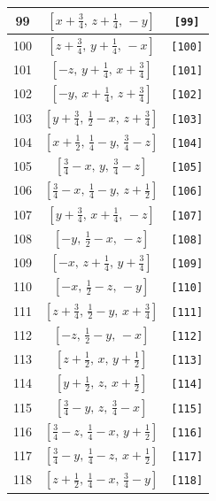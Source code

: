 \documentclass[fleqn,8pt]{jsarticle}
\begin{document}
\begin{longtable}{ccc}
99 & $\left[ x + \frac{3}{4},\, z + \frac{1}{4},\, - y \right]$ & {\tt [99]} \\ \hline
100 & $\left[ z + \frac{3}{4},\, y + \frac{1}{4},\, - x \right]$ & {\tt [100]} \\ \hline
101 & $\left[ - z,\, y + \frac{1}{4},\, x + \frac{3}{4} \right]$ & {\tt [101]} \\ \hline
102 & $\left[ - y,\, x + \frac{1}{4},\, z + \frac{3}{4} \right]$ & {\tt [102]} \\ \hline
103 & $\left[ y + \frac{3}{4},\, \frac{1}{2} - x,\, z + \frac{3}{4} \right]$ & {\tt [103]} \\ \hline
104 & $\left[ x + \frac{1}{2},\, \frac{1}{4} - y,\, \frac{3}{4} - z \right]$ & {\tt [104]} \\ \hline
105 & $\left[ \frac{3}{4} - x,\, y,\, \frac{3}{4} - z \right]$ & {\tt [105]} \\ \hline
106 & $\left[ \frac{3}{4} - x,\, \frac{1}{4} - y,\, z + \frac{1}{2} \right]$ & {\tt [106]} \\ \hline
107 & $\left[ y + \frac{3}{4},\, x + \frac{1}{4},\, - z \right]$ & {\tt [107]} \\ \hline
108 & $\left[ - y,\, \frac{1}{2} - x,\, - z \right]$ & {\tt [108]} \\ \hline
109 & $\left[ - x,\, z + \frac{1}{4},\, y + \frac{3}{4} \right]$ & {\tt [109]} \\ \hline
110 & $\left[ - x,\, \frac{1}{2} - z,\, - y \right]$ & {\tt [110]} \\ \hline
111 & $\left[ z + \frac{3}{4},\, \frac{1}{2} - y,\, x + \frac{3}{4} \right]$ & {\tt [111]} \\ \hline
112 & $\left[ - z,\, \frac{1}{2} - y,\, - x \right]$ & {\tt [112]} \\ \hline
113 & $\left[ z + \frac{1}{2},\, x,\, y + \frac{1}{2} \right]$ & {\tt [113]} \\ \hline
114 & $\left[ y + \frac{1}{2},\, z,\, x + \frac{1}{2} \right]$ & {\tt [114]} \\ \hline
115 & $\left[ \frac{3}{4} - y,\, z,\, \frac{3}{4} - x \right]$ & {\tt [115]} \\ \hline
116 & $\left[ \frac{3}{4} - z,\, \frac{1}{4} - x,\, y + \frac{1}{2} \right]$ & {\tt [116]} \\ \hline
117 & $\left[ \frac{3}{4} - y,\, \frac{1}{4} - z,\, x + \frac{1}{2} \right]$ & {\tt [117]} \\ \hline
118 & $\left[ z + \frac{1}{2},\, \frac{1}{4} - x,\, \frac{3}{4} - y \right]$ & {\tt [118]} \\ \hline

\end{longtable}
\end{document}
